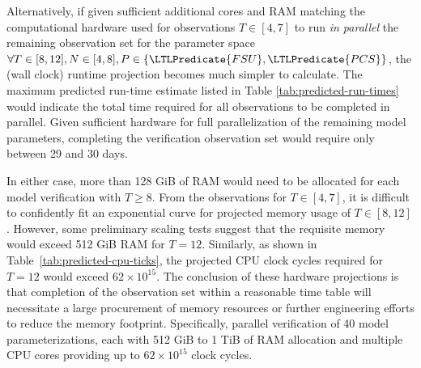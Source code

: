 Alternatively, if given sufficient additional cores and RAM matching the computational hardware used for observations \(T \in [4, 7]\) to run \emph{in parallel} the remaining observation set for the parameter space \(\forall T \in [8, 12], N \in [4, 8], P \in \{ \LTLPredicate{FSU}, \LTLPredicate{PCS} \}\), the (wall clock) runtime projection becomes much simpler to calculate.
The maximum predicted run-time estimate listed in Table \ref{tab:predicted-run-times} would indicate the total time required for all observations to be completed in parallel.
Given sufficient hardware for full parallelization of the remaining model parameters, completing the verification observation set would require only between 29 and 30 days.

In either case, more than 128 GiB of RAM would need to be allocated for each model verification with \(T \geq 8\).
From the observations for \(T \in [4, 7]\), it is difficult to confidently fit an exponential curve for projected memory usage of \(T \in [8, 12]\).
However, some preliminary scaling tests suggest that the requisite memory would exceed 512 GiB RAM for \(T = 12\).
Similarly, as shown in Table\ \ref{tab:predicted-cpu-ticks}, the projected CPU clock cycles required for \(T = 12\) would exceed \(62 \times 10^{15}\).
The conclusion of these hardware projections is that completion of the observation set within a reasonable time table will necessitate a large procurement of memory resources or further engineering efforts to reduce the memory footprint.
Specifically, parallel verification of 40 model parameterizations, each with 512 GiB to 1 TiB of RAM allocation and multiple CPU cores providing up to \(62 \times 10^{15}\) clock cycles.